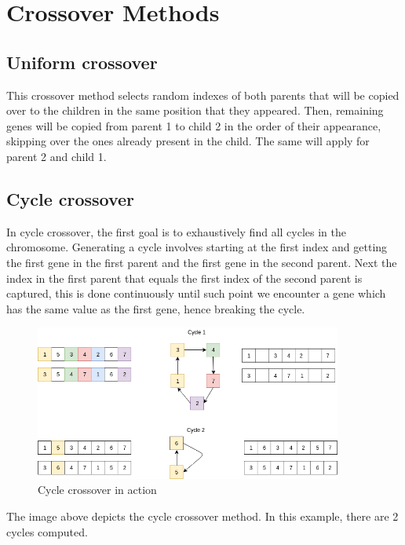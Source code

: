 \section{Crossover Methods}

\subsection{Uniform crossover}

This crossover method selects random indexes of both parents that will be copied over to the children in the same position that they appeared. Then, remaining genes will be copied from parent 1 to child 2 in the order of their appearance, skipping over the ones already present in the child. The same will apply for parent 2 and child 1.

\subsection{Cycle crossover}

In cycle crossover, the first goal is to exhaustively find all cycles in the chromosome. Generating a cycle involves starting at the first index and getting the first gene in the first parent and the first gene in the second parent. Next the index in the first parent that equals the first index of the second parent is captured, this is done continuously until such point we encounter a gene which has the same value as the first gene, hence breaking the cycle. 

\begin{figure}[h!]
\vspace{-5pt}
\centering
\includegraphics[width=0.9\textwidth]{images/cycle-crossover.png}
\caption{\label{fig:3col_graph}Cycle crossover in action}
\end{figure}

The image above depicts the cycle crossover method. In this example, there are 2 cycles computed.